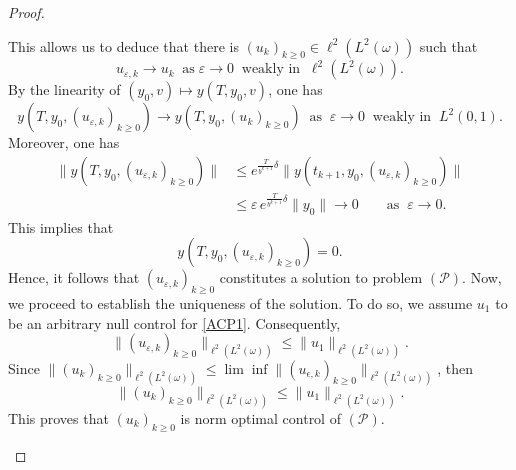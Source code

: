\documentclass[10pt,a4paper]{amsart}
\begin{document}
\begin{proof}
\begin{enumerate}
\begin{equation}
   \end{equation}
   This allows us to deduce that there is $(u_k)_{k \geq 0} \in \ell^2(L^2(\omega))$ such that 
   \[u_{\varepsilon,k} \to u_k \;\;\text{as}\;\varepsilon \to 0 \;\;\text{weakly in}\;\;\ell^2(L^2(\omega)).\]
   By the linearity of $(y_0,v) \mapsto y(T, y_0, v)$, one has
   \begin{equation*}
       y(T,y_0,(u_{\varepsilon,k})_{k \geq 0}) \to y(T,y_0,(u_k)_{k \geq 0}) \;\;\text{as}\;\;\varepsilon\to 0\;\;\text{weakly in}\;\;L^2(0,1).
   \end{equation*}
   Moreover, one has
   \begin{align*}
       \| y(T,y_0,(u_{\varepsilon,k})_{k \geq 0})\|
       &\leq e^{\frac{T}{b^{k+1}}\delta} \| y(t_{k+1},y_0,(u_{\varepsilon,k})_{k \geq 0})\| \\
       &\leq \varepsilon \, e^{\frac{T}{b^{k+1}}\delta}\|y_0\| \to 0 \qquad\text{as}\;\;\varepsilon\to 0.
   \end{align*}
   This implies that 
   \[y(T,y_0,(u_{\varepsilon,k})_{k \geq 0})=0.\]
    Hence, it follows that \( (u_{\varepsilon,k})_{k \geq 0} \) constitutes a solution to problem \( (\mathcal{P}) \). Now, we proceed to establish the uniqueness of the solution. To do so, we assume \( u_1 \) to be an arbitrary null control for \eqref{ACP1}. Consequently,
    \begin{equation*}
       \| (u_{\varepsilon,k})_{k \geq 0} \|_{\ell^2(L^2(\omega))}\leq \| u_1\|_{\ell^2(L^2(\omega))}.
    \end{equation*}
    Since $\| (u_k)_{k \geq 0}\|_{\ell^2(L^2(\omega))} \leq \lim \inf \|(u_{\epsilon,k})_{k \geq 0}\|_{\ell^2(L^2(\omega))}$, then
   \begin{equation*}
       \| (u_k)_{k \geq 0}\|_{\ell^2(L^2(\omega))} \leq \|u_1\|_{\ell^2(L^2(\omega))}.
   \end{equation*}
   This proves that $(u_k)_{k \geq 0}$ is norm optimal control of $(\mathcal{P})$.
\end{enumerate}
\end{proof}
\end{document}
